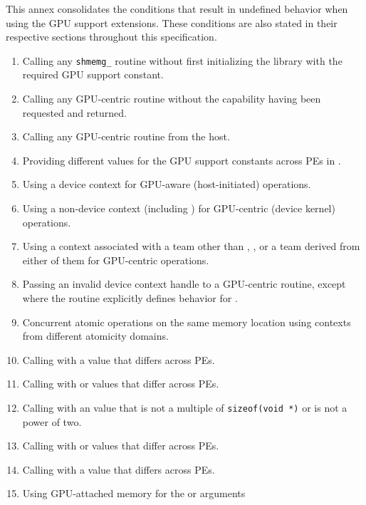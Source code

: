 
This annex consolidates the conditions that result in undefined behavior when
using the \openshmem GPU support extensions. These conditions are also stated in
their respective sections throughout this specification.

\begin{enumerate}
\item Calling any \texttt{shmemg\_} routine without first initializing the
  \openshmem library with the required GPU support constant.
\item Calling any GPU-centric routine without the
   capability having been requested and
  returned.
\item Calling any GPU-centric routine from the host.
\item Providing different values for the  GPU support constants
  across \acp{PE} in .
\item Using a device context for GPU-aware (host-initiated) operations.
\item Using a non-device context (including ) for
  GPU-centric (device kernel) operations.
\item Using a context associated with a team other than
  , , or a
  team derived from either of them for GPU-centric operations.
\item Passing an invalid device context handle to a GPU-centric routine, except
  where the routine explicitly defines behavior for
  .
\item Concurrent atomic operations on the same memory location using contexts
  from different atomicity domains.
\item Calling  with a  value that differs across
  \acp{PE}.
\item Calling  with  or  values that
  differ across \acp{PE}.
\item Calling  with an  value that is not a
  multiple of \texttt{sizeof(void *)} or is not a power of two.
\item Calling  with  or  values that
  differ across \acp{PE}.
\item Calling  with a  value that differs across
  \acp{PE}.
\item Using GPU-attached memory for the  or  arguments

\end{enumerate}
